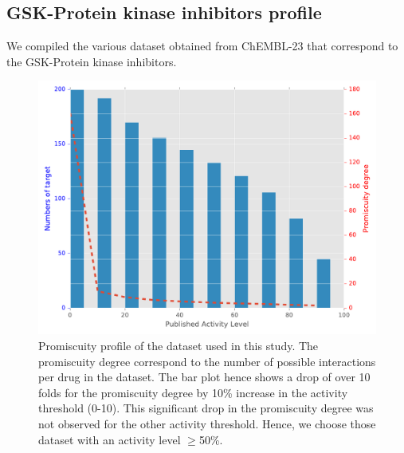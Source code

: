 \documentclass[a4paper, 11pt]{article}
\begin{document}
\subsection*{GSK-Protein kinase inhibitors profile}
We compiled the various dataset obtained from ChEMBL-23 that correspond to the GSK-Protein kinase inhibitors.
\begin{figure}[H]
	\includegraphics[width=\linewidth]{figures/activityplot.pdf}
	\centering
	\caption{Promiscuity profile of the dataset used in this study. The promiscuity degree correspond to the number of possible interactions per drug in the dataset. The bar plot hence shows a drop of over 10 folds for the promiscuity degree by 10\% increase in the activity threshold (0-10). This significant drop in the promiscuity degree was not observed for the other activity threshold. Hence, we choose those dataset with an activity level $\geq$50\%.}
	\label{gsk-pki}
\end{figure}
\end{document}
